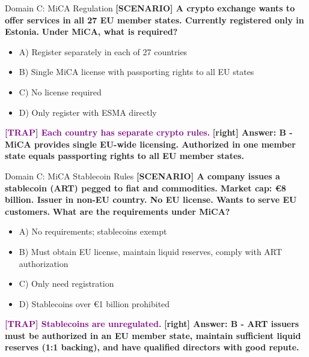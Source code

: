 \documentclass[11pt,a4paper]{beamer}
\newcommand{\trap}[1]{\textcolor{purple}{\textbf{[TRAP] #1}}}
\newcommand{\correct}[1]{\textcolor{green!50!black}{\textbf{[right] #1}}}
\newcommand{\scenario}[1]{\textcolor{blue!70!black}{\textbf{[SCENARIO] #1}}}
\begin{document}
\begin{frame}{Domain C: MiCA Regulation}
\scenario{A crypto exchange wants to offer services in all 27 EU member states. Currently registered only in Estonia.}
\vspace{0.2cm}
\textbf{Under MiCA, what is required?}
\vspace{0.2cm}
\begin{itemize}
    \item A) Register separately in each of 27 countries
    \item B) Single MiCA license with passporting rights to all EU states
    \item C) No license required
    \item D) Only register with ESMA directly
\end{itemize}
\vspace{0.2cm}
\trap{Each country has separate crypto rules.}
\correct{Answer: B - MiCA provides single EU-wide licensing. Authorized in one member state equals passporting rights to all EU member states.}
\end{frame}

\begin{frame}{Domain C: MiCA Stablecoin Rules}
\scenario{A company issues a stablecoin (ART) pegged to fiat and commodities. Market cap: €8 billion. Issuer in non-EU country. No EU license. Wants to serve EU customers.}
\vspace{0.2cm}
\textbf{What are the requirements under MiCA?}
\vspace{0.2cm}
\begin{itemize}
    \item A) No requirements; stablecoins exempt
    \item B) Must obtain EU license, maintain liquid reserves, comply with ART authorization
    \item C) Only need registration
    \item D) Stablecoins over €1 billion prohibited
\end{itemize}
\vspace{0.2cm}
\trap{Stablecoins are unregulated.}
\correct{Answer: B - ART issuers must be authorized in an EU member state, maintain sufficient liquid reserves (1:1 backing), and have qualified directors with good repute.}
\end{frame}
\end{document}
